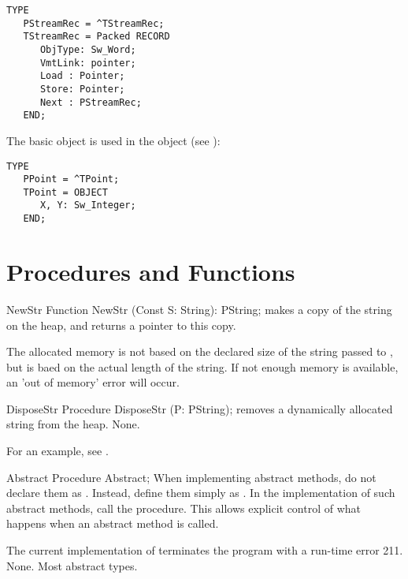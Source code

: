 \begin{verbatim}
TYPE
   PStreamRec = ^TStreamRec;
   TStreamRec = Packed RECORD
      ObjType: Sw_Word;
      VmtLink: pointer;
      Load : Pointer;
      Store: Pointer;
      Next : PStreamRec;
   END;
\end{verbatim}

The  basic object is used in the  object (see
):
\begin{verbatim}
TYPE
   PPoint = ^TPoint;
   TPoint = OBJECT
      X, Y: Sw_Integer;
   END;
\end{verbatim}

\section{Procedures and Functions}

\begin{function}{NewStr}
\Declaration
Function NewStr (Const S: String): PString;
\Description
{} makes a copy of the string  on the heap,
and returns a pointer to this copy.

The allocated memory is not based on the declared size of the string passed
to , but is baed on the actual length of the string.
\Errors
If not enough memory is available, an 'out of memory' error will occur.
\SeeAlso
{}
\end{function}

\html{}

\begin{procedure}{DisposeStr}
\Declaration
Procedure DisposeStr (P: PString);
\Description
{} removes a dynamically allocated string from the heap.
\Errors
None.
\SeeAlso
{}
\end{procedure}

For an example, see .

\begin{procedure}{Abstract}
\Declaration
Procedure Abstract;
\Description
When implementing abstract methods, do not declare them as .
Instead, define them simply as . In the implementation of such
abstract methods, call the  procedure. This allows explicit
control of what happens when an abstract method is called.

The current implementation of  terminates the program with 
a run-time error 211.
\Errors
None.
\SeeAlso Most abstract types.
\end{procedure}


